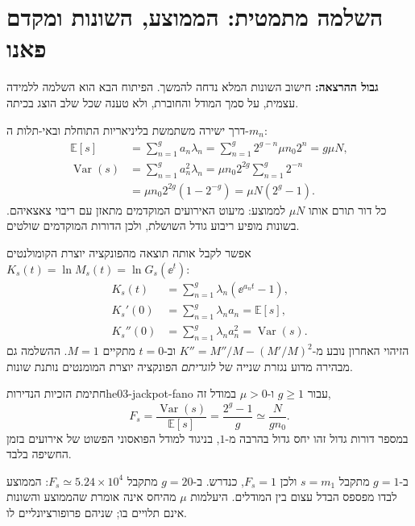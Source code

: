 \section{השלמה מתמטית: הממוצע, השונות ומקדם פאנו}\label{sec:he03-moments}
\textbf{גבול ההרצאה:} חישוב השונות המלא נדחה להמשך. הפיתוח הבא הוא השלמה ללמידה עצמית, על סמך המודל והחוברת, ולא טענה שכל שלב הוצג בכיתה.

דרך ישירה משתמשת בליניאריות התוחלת ובאי-תלות ה-$m_n$:
\begin{align}
\mathbb{E}[s]&=\sum_{n=1}^g a_n\lambda_n
=\sum_{n=1}^g2^{g-n}\mu n_0 2^n
=g\mu N,\label{eq:he03-mutant-mean}\\
\operatorname{Var}(s)&=\sum_{n=1}^g a_n^2\lambda_n
=\mu n_0 2^{2g}\sum_{n=1}^g2^{-n}\label{eq:he03-mutant-var-start}\\
&=\mu n_0 2^{2g}(1-2^{-g})
=\mu N(2^g-1).\label{eq:he03-mutant-var}
\end{align}
כל דור תורם אותו $\mu N$ לממוצע: מיעוט האירועים המוקדמים מתאזן עם ריבוי צאצאיהם. בשונות מופיע ריבוע גודל השושלת, ולכן הדורות המוקדמים שולטים.

אפשר לקבל אותה תוצאה מהפונקציה יוצרת הקומולנטים $K_s(t)=\ln M_s(t)=\ln G_s(\ee^t)$:
\begin{align}
K_s(t)&=\sum_{n=1}^g\lambda_n(\ee^{a_nt}-1),\label{eq:he03-cgf}\\
K_s'(0)&=\sum_{n=1}^g\lambda_na_n=\mathbb{E}[s],\label{eq:he03-cgf-first}\\
K_s''(0)&=\sum_{n=1}^g\lambda_na_n^2=\operatorname{Var}(s).\label{eq:he03-cgf-second}
\end{align}
הזיהוי האחרון נובע מ-$K''=M''/M-(M'/M)^2$ וב-$t=0$ מתקיים $M=1$. ההשלמה גם מבהירה מדוע נגזרת שנייה של \emph{לוגריתם} הפונקציה יוצרת המומנטים נותנת שונות.

\begin{proposition}{חתימת הזכיות הנדירות}{he03-jackpot-fano}
עבור $g\ge1$ ו-$\mu>0$ במודל זה,
\begin{equation}\label{eq:he03-jackpot-fano}
F_s=\frac{\operatorname{Var}(s)}{\mathbb{E}[s]}
=\frac{2^g-1}{g}\simeq\frac{N}{g n_0}.
\end{equation}
במספר דורות גדול זהו יחס גדול בהרבה מ-$1$, בניגוד למודל הפואסוני הפשוט של אירועים בזמן החשיפה בלבד.
\end{proposition}
ב-$g=1$ מתקבל $s=m_1$ ולכן $F_s=1$, כנדרש. ב-$g=20$ מתקבל $F_s\simeq5.24\times10^4$: הממוצע לבדו מפספס הבדל עצום בין המודלים. היעלמות $\mu$ מהיחס אינה אומרת שהממוצע והשונות אינם תלויים בו; שניהם פרופורציונליים לו.

